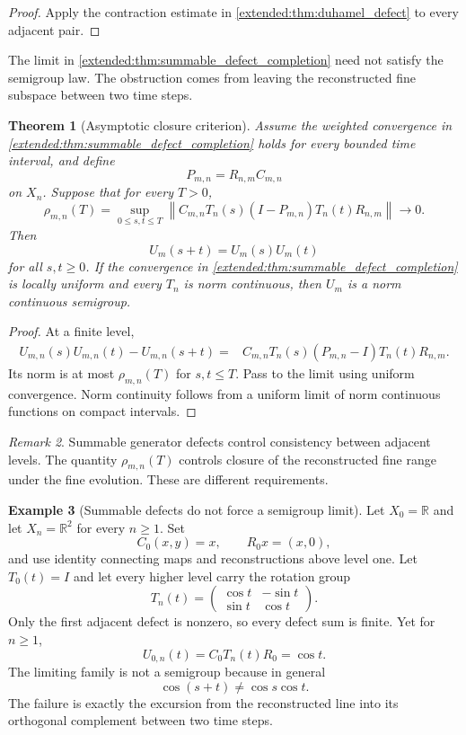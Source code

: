 \documentclass[11pt,a4paper]{article}
\newtheorem{theorem}{Theorem}[section]
\theoremstyle{definition}
\newtheorem{example}[theorem]{Example}
\theoremstyle{remark}
\newtheorem{remark}[theorem]{Remark}
\newcommand{\norm}[1]{\left\lVert#1\right\rVert}
\newcommand{\RR}{\mathbb R}
\begin{document}
\begin{proof}
Apply the contraction estimate in \cref{extended:thm:duhamel_defect} to every adjacent pair.
\end{proof}

The limit in \cref{extended:thm:summable_defect_completion} need not satisfy the semigroup law. The obstruction comes from leaving the reconstructed fine subspace between two time steps.

\begin{theorem}[Asymptotic closure criterion]\label{extended:record:022}\label{extended:thm:asymptotic_closure}
Assume the weighted convergence in \cref{extended:thm:summable_defect_completion} holds for every bounded time interval, and define
\[
P_{m,n}=R_{n,m}C_{m,n}
\]
on \(X_n\). Suppose that for every \(T>0\),
\[
\rho_{m,n}(T)
=
\sup_{0\leq s,t\leq T}
\norm{
C_{m,n}T_n(s)(I-P_{m,n})T_n(t)R_{n,m}
}
\longrightarrow0.
\]
Then
\[
U_m(s+t)=U_m(s)U_m(t)
\]
for all \(s,t\geq0\). If the convergence in \cref{extended:thm:summable_defect_completion} is locally uniform and every \(T_n\) is norm continuous, then \(U_m\) is a norm continuous semigroup.
\end{theorem}

\begin{proof}
At a finite level,
\[
\begin{aligned}
U_{m,n}(s)U_{m,n}(t)-U_{m,n}(s+t)
={}&
C_{m,n}T_n(s)
(P_{m,n}-I)
T_n(t)R_{n,m}.
\end{aligned}
\]
Its norm is at most \(\rho_{m,n}(T)\) for \(s,t\leq T\). Pass to the limit using uniform convergence. Norm continuity follows from a uniform limit of norm continuous functions on compact intervals.
\end{proof}

\begin{remark}\label{extended:record:023}
Summable generator defects control consistency between adjacent levels. The quantity \(\rho_{m,n}(T)\) controls closure of the reconstructed fine range under the fine evolution. These are different requirements.
\end{remark}

\begin{example}[Summable defects do not force a semigroup limit]\label{extended:record:024}\label{extended:ex:summable_not_semigroup}
Let \(X_0=\RR\) and let \(X_n=\RR^2\) for every \(n\geq1\). Set
\[
C_0(x,y)=x,
\qquad
R_0x=(x,0),
\]
and use identity connecting maps and reconstructions above level one. Let \(T_0(t)=I\) and let every higher level carry the rotation group
\[
T_n(t)
=
\begin{pmatrix}
\cos t&-\sin t\\
\sin t&\cos t
\end{pmatrix}.
\]
Only the first adjacent defect is nonzero, so every defect sum is finite. Yet for \(n\geq1\),
\[
U_{0,n}(t)=C_0T_n(t)R_0=\cos t.
\]
The limiting family is not a semigroup because in general
\[
\cos(s+t)\neq\cos s\cos t.
\]
The failure is exactly the excursion from the reconstructed line into its orthogonal complement between two time steps.
\end{example}
\end{document}
